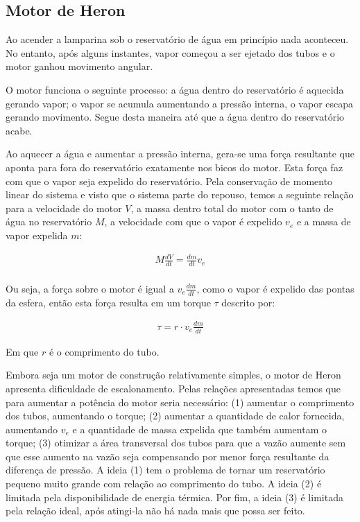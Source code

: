 \subsection{Motor de Heron} %
Ao acender a lamparina sob o reservatório de água em princípio nada aconteceu. No entanto, após alguns instantes, vapor começou a ser ejetado dos tubos e o motor ganhou movimento angular. 

O motor funciona o seguinte processo: a água dentro do reservatório é aquecida gerando vapor; o vapor se acumula aumentando a pressão interna, o vapor escapa gerando movimento. Segue desta maneira até que a água dentro do reservatório acabe.

Ao aquecer a água e aumentar a pressão interna, gera-se uma força resultante que aponta para fora do reservatório exatamente nos bicos do motor. Esta força faz com que o vapor seja expelido do reservatório. Pela conservação de momento linear do sistema e visto que o sistema parte do repouso, temos a seguinte relação para a velocidade do motor \(V\), a massa dentro total do motor com o tanto de água no reservatório \(M\), a velocidade com que o vapor é expelido \(v_e\) e a massa de vapor expelida \(m\):

\begin{align*}
    M \frac{dV}{dt}  = \frac{dm}{dt} v_e  \\
\end{align*}

Ou seja, a força sobre o motor é igual a \(v_e \frac{dm}{dt}\), como o vapor é expelido das pontas da esfera, então esta força resulta em um torque \(\tau\) descrito por:

\begin{align*}
    \tau = r \cdot v_e \frac{d m}{dt}  
\end{align*}

Em que \(r\) é o comprimento do tubo.

Embora seja um motor de construção relativamente simples, o motor de Heron apresenta dificuldade de escalonamento. Pelas relações apresentadas temos que para aumentar a potência do motor seria necessário: (1) aumentar o comprimento dos tubos, aumentando o torque; (2) aumentar a quantidade de calor fornecida,  aumentando \(v_e\) e a quantidade de massa expelida que também aumentam o torque; (3) otimizar a área transversal dos tubos para que a vazão aumente sem que esse aumento na vazão seja compensando por menor força resultante da diferença de pressão. A ideia (1) tem o problema de tornar um reservatório pequeno muito grande com relação ao comprimento do tubo. A ideia (2) é limitada pela disponibilidade de energia térmica. Por fim, a ideia (3) é limitada pela relação ideal, após atingi-la não há nada mais que possa ser feito.

